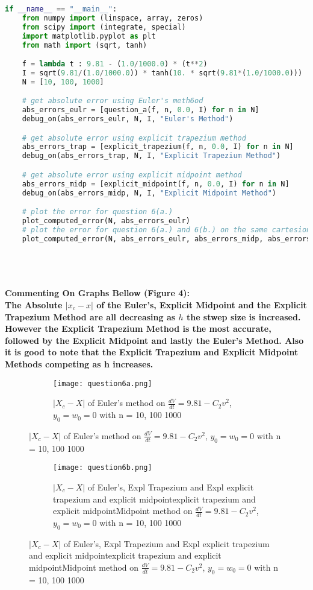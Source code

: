 \documentclass{article}
\begin{document}
\begin{lstlisting}[language=Python]
if __name__ == "__main__":
    from numpy import (linspace, array, zeros)
    from scipy import (integrate, special)
    import matplotlib.pyplot as plt
    from math import (sqrt, tanh)

    f = lambda t : 9.81 - (1.0/1000.0) * (t**2)
    I = sqrt(9.81/(1.0/1000.0)) * tanh(10. * sqrt(9.81*(1.0/1000.0)))
    N = [10, 100, 1000]

    # get absolute error using Euler's meth6od
    abs_errors_eulr = [question_a(f, n, 0.0, I) for n in N]
    debug_on(abs_errors_eulr, N, I, "Euler's Method")

    # get absolute error using explicit trapezium method
    abs_errors_trap = [explicit_trapezium(f, n, 0.0, I) for n in N]
    debug_on(abs_errors_trap, N, I, "Explicit Trapezium Method")

    # get absolute error using explicit midpoint method
    abs_errors_midp = [explicit_midpoint(f, n, 0.0, I) for n in N]
    debug_on(abs_errors_midp, N, I, "Explicit Midpoint Method")

    # plot the error for question 6(a.)
    plot_computed_error(N, abs_errors_eulr)
    # plot the error for question 6(a.) and 6(b.) on the same cartesion plane
    plot_computed_error(N, abs_errors_eulr, abs_errors_midp, abs_errors_trap)
\end{lstlisting}
\textbf{\\ \\ \\ Commenting On Graphs Bellow (Figure 4): \\ The Absolute $|x_c - x|$ of the Euler's, Explicit Midpoint and the Explicit Trapezium Method are all decreasing as $h$ the stwep size is increased. However the Explicit Trapezium Method is the most accurate, followed by the Explicit Midpoint and lastly the Euler's Method. Also it is good to note that the Explicit Trapezium and Explicit Midpoint Methods competing as h increases. }
\pagebreak
\begin{figure}[h!]
  \centering
  \begin{subfigure}{\linewidth}
    \texttt{[image: question6a.png]}
    \caption{$|X_c - X|$ of Euler's method on $\frac{dV}{dt} = 9.81 - C_2v^2$, $y_0 = w_0 = 0$ with n = 10, 100 1000}
  \end{subfigure}
\end{figure}

\begin{figure}[h!]
  \centering
  \begin{subfigure}{\linewidth}
    \texttt{[image: question6b.png]}
    \caption{$|X_c - X|$ of Euler's, Expl Trapezium and Expl explicit trapezium and explicit
midpointexplicit trapezium and explicit
midpointMidpoint method on $\frac{dV}{dt} = 9.81 - C_2v^2$, $y_0 = w_0 = 0$ with n = 10, 100 1000}
  \end{subfigure}
\end{figure}
\pagebreak
\end{document}
